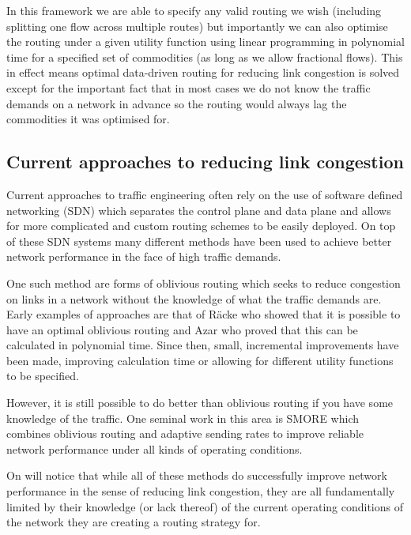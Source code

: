 In this framework we are able to specify any valid routing we wish (including splitting one flow across multiple routes) but importantly we can also optimise the routing under a given utility function using linear programming in polynomial time for a specified set of commodities (as long as we allow fractional flows)\cite{cormen2009introduction}. This in effect means optimal data-driven routing for reducing link congestion is solved except for the important fact that in most cases we do not know the traffic demands on a network in advance so the routing would always lag the commodities it was optimised for.

\subsection{Current approaches to reducing link congestion}

Current approaches to traffic engineering often rely on the use of software defined networking (SDN) which separates the control plane and data plane and allows for more complicated and custom routing schemes to be easily deployed\cite{doi:10.1002/sec.1737}. On top of these SDN systems many different methods have been used to achieve better network performance in the face of high traffic demands.

One such method are forms of oblivious routing\cite{Bansal2008} which seeks to reduce congestion on links in a network without the knowledge of what the traffic demands are. Early examples of approaches are that of R\"acke\cite{racke2002minimizing} who showed that it is possible to have an optimal oblivious routing and Azar\cite{azar2004optimal} who proved that this can be calculated in polynomial time. Since then, small, incremental improvements have been made, improving calculation time or allowing for different utility functions to be specified\cite{kodialam2008advances}.

However, it is still possible to do better than oblivious routing if you have some knowledge of the traffic. One seminal work in this area is SMORE\cite{kumar2018semi} which combines oblivious routing and adaptive sending rates to improve reliable network performance under all kinds of operating conditions.

On will notice that while all of these methods do successfully improve network performance in the sense of reducing link congestion, they are all fundamentally limited by their knowledge (or lack thereof) of the current operating conditions of the network they are creating a routing strategy for. 


